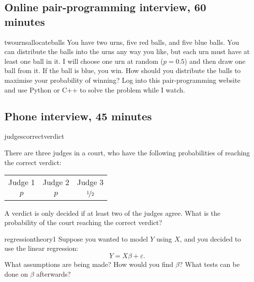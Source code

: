 \documentclass[a4paper]{article}
\begin{document}
\clearpage





\clearpage
\subsection{Online pair-programming interview, 60 minutes}
\begin{question}{twournsallocateballs}
You have two urns, five red balls, and five blue balls.
You can distribute the balls into the urns any way you like, but each urn must have at least one ball in it.
I will choose one urn at random ($p=0.5$) and then draw one ball from it.
If the ball is blue, you win.
How should you distribute the balls to maximise your probability of winning?
Log into this pair-programming website and use Python or C++ to solve the problem while I watch.
\end{question}

\clearpage



\clearpage
\subsection{Phone interview, 45 minutes}
\begin{question}{judgescorrectverdict}

There are three judges in a court, who have the following probabilities of reaching the correct verdict:
\begin{center}
\begin{tabular}{ccc}
Judge 1 & Judge 2 & Judge 3 \\
$p$ &
$p$ &
$\nicefrac{1}{2}$ \\
\end{tabular}
\end{center}
A verdict is only decided if at least two of the judges agree.
What is the probability of the court reaching the correct verdict?
\end{question}


\begin{question}{regressiontheory1}
Suppose you wanted to model $Y$ using $X$, and you decided to use the linear regression:
\[
  Y = X \beta + \varepsilon
  \text{.}
\]
What assumptions are being made?
How would you find $\beta$?
What tests can be done on $\beta$ afterwards?
\end{question}
\end{document}
